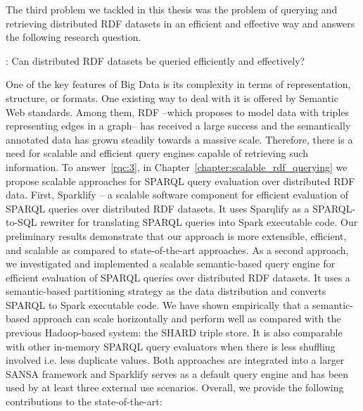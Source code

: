 The third problem we tackled in this thesis was the problem of querying and retrieving distributed \gls{RDF} datasets in an efficient and effective way and answers the following research question.

\begin{tcolorbox}
\textbf{\rqNr[RQ3]\label{rqc:3}}: Can distributed \gls{RDF} datasets be queried efficiently and effectively?
\end{tcolorbox}

One of the key features of Big Data is its complexity in terms of representation, structure, or formats.
One existing way to deal with it is offered by Semantic Web standards.
Among them, \gls{RDF} --which proposes to model data with triples representing edges in a graph-- has received a large success and the semantically annotated data has grown steadily towards a massive scale.
Therefore, there is a need for scalable and efficient query engines capable of retrieving such information.
To answer~\ref{rqc:3}, in Chapter~\ref{chapter:scalable_rdf_querying} we propose scalable approaches for \gls{SPARQL} query evaluation over distributed \gls{RDF} data. 
First, Sparklify -- a scalable software component for efficient evaluation of \gls{SPARQL} queries over distributed \gls{RDF} datasets. 
It uses Sparqlify as a SPARQL-to-SQL rewriter for translating SPARQL queries into Spark executable code.
Our preliminary results demonstrate that our approach is more extensible, efficient, and scalable as compared to state-of-the-art approaches.
As a second approach, we investigated and implemented a scalable semantic-based query engine for efficient evaluation of \gls{SPARQL} queries over distributed \gls{RDF} datasets. 
It uses a semantic-based partitioning strategy as the data distribution and converts \gls{SPARQL} to Spark executable code.
We have shown empirically that a semantic-based approach can scale horizontally and perform well as compared with the previous Hadoop-based system: the SHARD triple store.
It is also comparable with other in-memory \gls{SPARQL} query evaluators when there is less shuffling involved i.e. less duplicate values.
Both approaches are integrated into a larger SANSA framework and Sparklify serves as a default query engine and has been used by at least three external use scenarios.
Overall, we provide the following contributions to the state-of-the-art:

